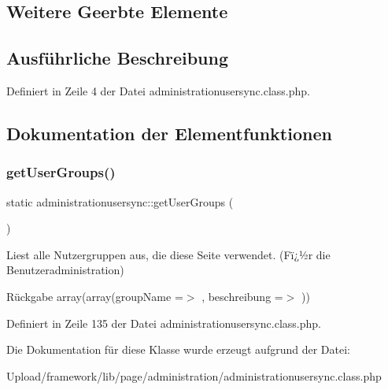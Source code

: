 \subsection*{Weitere Geerbte Elemente}


\subsection{Ausführliche Beschreibung}


Definiert in Zeile 4 der Datei administrationusersync.\+class.\+php.



\subsection{Dokumentation der Elementfunktionen}
\mbox{\label{classadministrationusersync_a017621e1115c3d33fb2b433400b42375}} 
\subsubsection{\texorpdfstring{get\+User\+Groups()}{getUserGroups()}}
{\footnotesize\ttfamily static administrationusersync\+::get\+User\+Groups (\begin{DoxyParamCaption}{ }\end{DoxyParamCaption})\hspace{0.3cm}{\ttfamily [static]}}

Liest alle Nutzergruppen aus, die diese Seite verwendet. (Fï¿½r die Benutzeradministration) \begin{DoxyReturn}{Rückgabe}
array(array(\textquotesingle{}group\+Name\textquotesingle{} =$>$ \textquotesingle{}\textquotesingle{}, \textquotesingle{}beschreibung\textquotesingle{} =$>$ \textquotesingle{}\textquotesingle{})) 
\end{DoxyReturn}


Definiert in Zeile 135 der Datei administrationusersync.\+class.\+php.



Die Dokumentation für diese Klasse wurde erzeugt aufgrund der Datei\+:\begin{DoxyCompactItemize}
\item 
Upload/framework/lib/page/administration/administrationusersync.\+class.\+php\end{DoxyCompactItemize}
